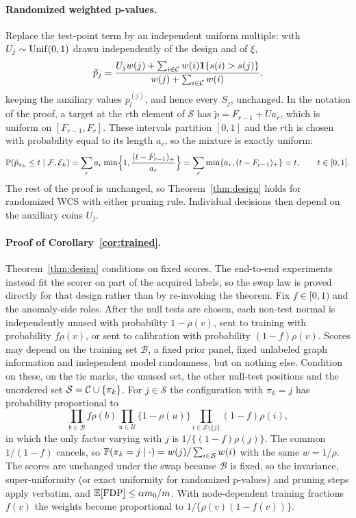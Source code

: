 \paragraph{Randomized weighted p-values.}
Replace the test-point term by an independent uniform multiple: with $U_j\sim{\rm Unif}(0,1)$ drawn independently of the design and of $\xi$,
\[
\tilde p_j=\frac{U_jw(j)+\sum_{i\in\mathcal{C}}w(i)\mathbf{1}\{s(i)>s(j)\}}{w(j)+\sum_{i\in\mathcal{C}}w(i)},
\]
keeping the auxiliary values $p_l^{(j)}$, and hence every $S_j$, unchanged. In the notation of the proof, a target at the $r$th element of $\mathcal S$ has $\tilde p=F_{r-1}+U a_r$, which is uniform on $[F_{r-1},F_r]$. These intervals partition $[0,1]$ and the $r$th is chosen with probability equal to its length $a_r$, so the mixture is exactly uniform:
\[
\mathbb{P}(\tilde p_{\pi_k}\le t\mid\mathcal F,\mathcal E_k)=\sum_r a_r\min\Bigl\{1,\frac{(t-F_{r-1})_+}{a_r}\Bigr\}=\sum_r\min\{a_r,(t-F_{r-1})_+\}=t,\qquad t\in[0,1].
\]
The rest of the proof is unchanged, so Theorem~\ref{thm:design} holds for randomized WCS with either pruning rule. Individual decisions then depend on the auxiliary coins $U_j$.

\paragraph{Proof of Corollary~\ref{cor:trained}.}
Theorem~\ref{thm:design} conditions on fixed scores. The end-to-end experiments instead fit the scorer on part of the acquired labels, so the swap law is proved directly for that design rather than by re-invoking the theorem. Fix $f\in[0,1)$ and the anomaly-side roles. After the null tests are chosen, each non-test normal is independently unused with probability $1-\rho(v)$, sent to training with probability $f\rho(v)$, or sent to calibration with probability $(1-f)\rho(v)$. Scores may depend on the training set $\mathcal B$, a fixed prior panel, fixed unlabeled graph information and independent model randomness, but on nothing else. Condition on these, on the tie marks, the unused set, the other null-test positions and the unordered set $\mathcal S=\mathcal{C}\cup\{\pi_k\}$. For $j\in\mathcal S$ the configuration with $\pi_k=j$ has probability proportional to
\[
\prod_{b\in\mathcal B}f\rho(b)\prod_{u\in\mathcal U}\{1-\rho(u)\}\prod_{i\in\mathcal S\setminus\{j\}}(1-f)\rho(i),
\]
in which the only factor varying with $j$ is $1/\{(1-f)\rho(j)\}$. The common $1/(1-f)$ cancels, so $\mathbb{P}(\pi_k=j\mid\cdot)=w(j)/\sum_{i\in\mathcal S}w(i)$ with the same $w=1/\rho$. The scores are unchanged under the swap because $\mathcal B$ is fixed, so the invariance, super-uniformity (or exact uniformity for randomized p-values) and pruning steps apply verbatim, and $\mathbb{E}[\operatorname{FDP}]\le\alpha m_0/m$. With node-dependent training fractions $f(v)$ the weights become proportional to $1/\{\rho(v)(1-f(v))\}$.

